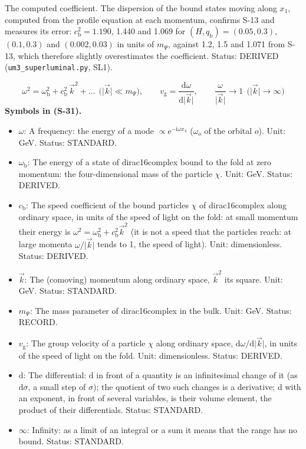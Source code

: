 \documentclass[
  10pt,
]{article}
\providecommand{\tightlist}{%
  \setlength{\itemsep}{0pt}\setlength{\parskip}{0pt}}
\begin{document}
The computed coefficient. The dispersion of the bound states moving
along \(x_1\), computed from the profile equation at each momentum,
confirms S-13 and measures its error: \(c_{\mathrm{b}}^2 = 1.190\),
1.440 and 1.069 for \((H, q_{\mathrm{b}}) = (0.05, 0.3)\),
\((0.1, 0.3)\) and \((0.002, 0.03)\) in units of \(m_\Psi\), against
1.2, 1.5 and 1.071 from S-13, which therefore slightly overestimates the
coefficient. Status: DERIVED (\texttt{um3\_superluminal.py}, SL1).

\[
\omega^2 = \omega_{\mathrm{b}}^2 + c_{\mathrm{b}}^2\,\vec k^2 + \dots\ \ \big(\lvert\vec k\rvert \ll m_\Psi\big),\qquad
v_{\mathrm{g}} = \frac{\mathrm{d}\omega}{\mathrm{d}\lvert\vec k\rvert},\qquad
\frac{\omega}{\lvert\vec k\rvert} \to 1\ \ \big(\lvert\vec k\rvert \to \infty\big) \tag{S-31}
\] \textbf{Symbols in (S-31).}

\begin{itemize}
\tightlist
\item
  \(\omega\): A frequency: the energy of a mode
  \(\propto \mathrm{e}^{-\mathrm{i}\omega x_4}\) (\(\omega_o\) of the
  orbital \(o\)). Unit: GeV. Status: STANDARD.
\item
  \(\omega_{\mathrm{b}}\): The energy of a state of dirac16complex bound
  to the fold at zero momentum: the four-dimensional mass of the
  particle \(\chi\). Unit: GeV. Status: DERIVED.
\item
  \(c_{\mathrm{b}}\): The speed coefficient of the bound particles
  \(\chi\) of dirac16complex along ordinary space, in units of the speed
  of light on the fold: at small momentum their energy is
  \(\omega^2 = \omega_{\mathrm{b}}^2 + c_{\mathrm{b}}^2\vec k^2\) (it is
  not a speed that the particles reach: at large momenta
  \(\omega/\lvert\vec k\rvert\) tends to 1, the speed of light). Unit:
  dimensionless. Status: DERIVED.
\item
  \(\vec k\): The (comoving) momentum along ordinary space, \(\vec k^2\)
  its square. Unit: GeV. Status: STANDARD.
\item
  \(m_\Psi\): The mass parameter of dirac16complex in the bulk. Unit:
  GeV. Status: RECORD.
\item
  \(v_{\mathrm{g}}\): The group velocity of a particle \(\chi\) along
  ordinary space, \(\mathrm{d}\omega/\mathrm{d}\lvert\vec k\rvert\), in
  units of the speed of light on the fold. Unit: dimensionless. Status:
  DERIVED.
\item
  \(\mathrm{d}\): The differential: \(\mathrm{d}\) in front of a
  quantity is an infinitesimal change of it (as \(\mathrm{d}\sigma\), a
  small step of \(\sigma\)); the quotient of two such changes is a
  derivative; \(\mathrm{d}\) with an exponent, in front of several
  variables, is their volume element, the product of their
  differentials. Status: STANDARD.
\item
  \(\infty\): Infinity: as a limit of an integral or a sum it means that
  the range has no bound. Status: STANDARD.
\end{itemize}
\end{document}
